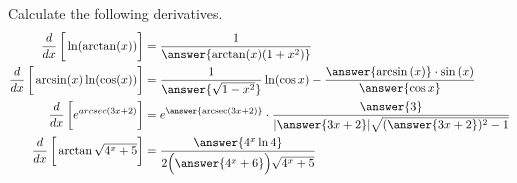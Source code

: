 \documentclass{ximera}
\author{Nela Lakos}
\DeclareMathOperator{\arcsec}{arcsec}
\begin{document}
\begin{exercise}

Calculate the following derivatives.
\begin{align*}
\frac{d}{dx}\left[\vphantom{\frac{d}{dx}}\ln(\arctan(x))\right] &= \frac{1}{\answer{\arctan(x)(1+x^2)}}\\
\frac{d}{dx}\left[\vphantom{\frac{d}{dx}}\arcsin(x)\ln(\cos(x))\right] &=\dfrac{1}{ \answer{\sqrt{1-x^2}}}\ln(\cos{x}) - \dfrac{\answer{\arcsin{(x)}}\cdot\sin{(x)}}{\answer{\cos{x}}}\\
\frac{d}{dx}\left[\vphantom{\frac{d}{dx}}e^{arcsec{\left(3x+2\right)}}\right] &=e^{ \answer{\arcsec(3x+2)}}\cdot\dfrac{\answer{3}}{|\answer{3x+2}|\sqrt{(\answer{3x+2})^2-1}}\\
\frac{d}{dx}\left[\vphantom{\frac{d}{dx}}\arctan{\sqrt{4^x +5}}\right] &=\dfrac{\answer{4^{x}\ln{4}}}{2\Bigl(\answer{4^{x}+6}\Bigr)\sqrt{4^{x}+5}}
\end{align*}
\end{exercise}
\end{document}
